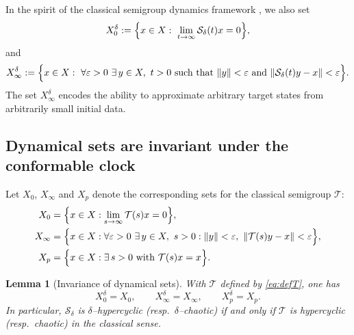 \documentclass[preprint,12pt]{elsarticle}
\newtheorem{lemma}{Lemma}
\begin{document}
In the spirit of the classical semigroup dynamics framework \cite{desch1997}, we also set
\[
X_0^\delta
:=
\Bigl\{x\in X:\ \lim_{t\to\infty}\mathcal S_\delta(t)x=0\Bigr\},
\]
and
\[
X_\infty^\delta
:=
\Bigl\{x\in X:\ \forall\varepsilon>0\ \exists\,y\in X,\ t>0\ \text{such that}\
\|y\|<\varepsilon\ \text{and}\ \|\mathcal S_\delta(t)y-x\|<\varepsilon\Bigr\}.
\]
The set $X_\infty^\delta$ encodes the ability to approximate arbitrary target states
from arbitrarily small initial data.

\subsection{Dynamical sets are invariant under the conformable clock}

Let $X_0$, $X_\infty$ and $X_p$ denote the corresponding sets for the classical semigroup
$\mathcal T$:
\begin{align*}
X_0&=\Bigl\{x\in X:\lim_{s\to\infty}\mathcal T(s)x=0\Bigr\},\\
X_\infty&=\Bigl\{x\in X:\forall\varepsilon>0\ \exists\,y\in X,\ s>0:
\|y\|<\varepsilon,\ \|\mathcal T(s)y-x\|<\varepsilon\Bigr\},\\
X_p&=\Bigl\{x\in X:\exists\,s>0\ \text{with}\ \mathcal T(s)x=x\Bigr\}.
\end{align*}

\begin{lemma}[Invariance of dynamical sets]\label{lem:invariance_sets}
With $\mathcal T$ defined by \eqref{eq:defT}, one has
\[
X_0^\delta=X_0,\qquad X_\infty^\delta=X_\infty,\qquad X_p^\delta=X_p.
\]
In particular, $\mathcal S_\delta$ is $\delta$--hypercyclic (resp.\ $\delta$--chaotic)
if and only if $\mathcal T$ is hypercyclic (resp.\ chaotic) in the classical sense.
\end{lemma}
\end{document}
